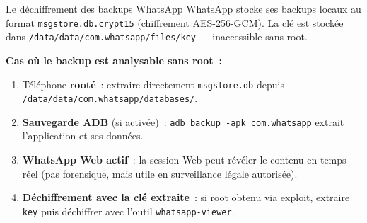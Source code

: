 \begin{boiteRemarque}{Le déchiffrement des backups WhatsApp}
WhatsApp stocke ses backups locaux au format \texttt{msgstore.db.crypt15}
(chiffrement AES-256-GCM). La clé est stockée dans
\texttt{/data/data/com.whatsapp/files/key} --- inaccessible sans root.

\textbf{Cas où le backup est analysable sans root~:}
\begin{enumerate}
    \item Téléphone \textbf{rooté}~: extraire directement \texttt{msgstore.db}
          depuis \texttt{/data/data/com.whatsapp/databases/}.
    \item \textbf{Sauvegarde ADB} (si activée)~: \texttt{adb backup
          -apk com.whatsapp} extrait l'application et ses données.
    \item \textbf{WhatsApp Web actif}~: la session Web peut révéler
          le contenu en temps réel (pas forensique, mais utile en
          surveillance légale autorisée).
    \item \textbf{Déchiffrement avec la clé extraite}~: si root obtenu
          via exploit, extraire \texttt{key} puis déchiffrer avec
          l'outil \texttt{whatsapp-viewer}.
\end{enumerate}
\end{boiteRemarque}

